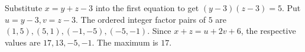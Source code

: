 Substitute $x=y+z-3$ into the first equation to get $(y-3)(z-3)=5$. Put $u=y-3,v=z-3$. The ordered integer factor pairs of $5$ are $(1,5),(5,1),(-1,-5),(-5,-1)$. Since $x+z=u+2v+6$, the respective values are $17,13,-5,-1$. The maximum is $\boxed{17}$.
